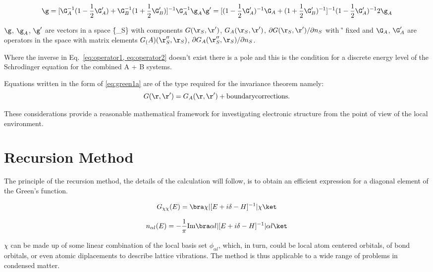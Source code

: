 \begin{eqnarray}
\label{eq:operator2}
\g = [\G^{-1}_{A}(1-\frac{1}{2}\G'_{A}) + \G^{-1}_{B}(1+\frac{1}{2}\G'_{B})]^{-1} \G^{-1}_{A}\g_{A}
\g'= [(1-\frac{1}{2}\G'_{A})^{-1}\G_{A} + (1+\frac{1}{2}\G'_{B})^{-1}]^{-1}(1 - \frac{1}{2}\G'_{A})^{-1}2\g_{A}
\end{eqnarray}

$\g$, $\g_{A}$, $\g'$ are vectors in a space \{\r_{S}\} with components $G(\r_{S},\r')$,
$G_{A}(\r_{S},\r')$, $\partial G(\r_{S},\r')/\partial n_{S}$ with \r' fixed and
$\G_{A}$, $\G'_{A}$ are operators in the space with matrix elements
$G_(A)(\r''_{S}, \r_{S})$, $\partial G_{A}(\r''_{S}, \r_{S})/\partial n_{S}$.

Where the inverse in Eq.~\ref{eq:operator1, eq:operator2} 
doesn't exist there is a pole and this is the condition
for a discrete energy level of the Schrodinger equation 
for the combined A + B systems. 

Equations written in the form of \ref{eq:green1a} are of the type required for the invariance theorem namely:
\begin{equation}
G(\r,\r') = G_{A}(\r,\r') + {\rm boundary corrections}.
\end{equation}

These considerations provide a reasonable mathematical framework for 
investigating electronic structure from the point of view of the local environment.

\section{Recursion Method}
The principle of the recursion method, the details of the calculation will follow, is 
to obtain an efficient expression for a diagonal element of the Green's function.

\begin{equation}
G_{\chi\chi}(E) = \bra\chi|[E + i\delta -H]^{-1}|\chi\ket
\end{equation}

\begin{equation}
n_{\alpha l}(E) = -\frac{1}{\pi} {\rm Im}\bra\alpha l|[E + i\delta -H]^{-1}|\alpha l\ket
\end{equation}

$\chi$ can be made up of some linear combination of the local basis set $\phi_{\alpha l}$,
which, in turn, could be local atom centered orbitals, of bond orbitals, 
or even atomic diplacements to describe lattice vibrations. The method is thus
applicable to a wide range of problems in condensed matter.

